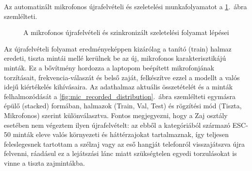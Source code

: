 Az automatizált mikrofonos újrafelvételi és szeletelési munkafolyamatot a \ref{fig:mic_recording_pipeline}.~ábra szemlélteti.

\begin{figure}[H]
\centering
{}
\caption{A mikrofonos újrafelvételi és szinkronizált szeletelési folyamat lépései}
\label{fig:mic_recording_pipeline}
\end{figure}

Az újrafelvételi folyamat eredményeképpen kizárólag a tanító (train) halmaz eredeti, tiszta mintái mellé kerülnek be az új, mikrofonos karakterisztikájú minták. Ez a bővítmény hordozza a laptopom beépített mikrofonjának torzításait, frekvencia-válaszát és belső zaját, felkészítve ezzel a modellt a valós idejű kiértékelés kihívásaira. Az adathalmaz aktuális összetételét és a minták felhalmozódását a \ref{fig:mic_recorded_distribution}.~ábra szemlélteti egymásra épülő (stacked) formában, halmazok (Train, Val, Test) és rögzítési mód (Tiszta, Mikrofonos) szerint különválasztva. Fontos megjegyezni, hogy a Zaj osztály esetében nem végeztem ilyen újrafelvételt: az ebből a kategóriából származó ESC-50 minták eleve valós környezeti és háttérzajokat tartalmaznak, így teljesen feleslegesnek tartottam a szélzaj vagy az eső hangját telefonról visszajátszva újra felvenni, ráadásul ez a lejátszási lánc miatt szükségtelen egyedi torzulásokat is vinne a tiszta zajmintákba.

